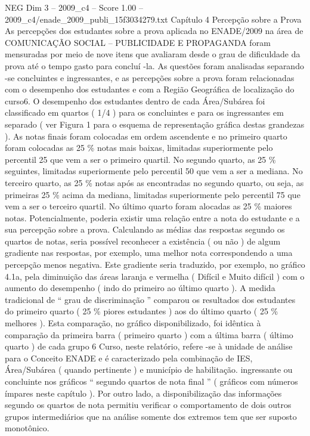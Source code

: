 \begin{textsample}{NEG Dim 3 – 2009\_c4 – Score 1.00 – 2009\_c4/enade\_2009\_publi\_15f3034279.txt}  \label{ex:f3_neg_162}
Capítulo 4 Percepção sobre a Prova As percepções dos estudantes sobre a prova aplicada no ENADE/2009 na área de COMUNICAÇÃO SOCIAL – PUBLICIDADE E PROPAGANDA foram mensuradas por meio de nove itens que avaliaram desde o grau de dificuldade da prova até o tempo gasto para concluí -la.
As questões foram analisadas separando -se concluintes e ingressantes, e as percepções sobre a prova foram relacionadas com o desempenho dos estudantes e com a Região Geográfica de localização do curso6.
O desempenho dos estudantes dentro de cada Área/Subárea foi classificado em quartos ( 1/4 ) para os concluintes e para os ingressantes em separado ( ver Figura 1 para o esquema de representação gráfica destas grandezas ).
As notas finais foram colocadas em ordem ascendente e no primeiro quarto foram colocadas as 25 \% notas mais baixas, limitadas superiormente pelo percentil 25 que vem a ser o primeiro quartil.
No segundo quarto, as 25 \% seguintes, limitadas superiormente pelo percentil 50 que vem a ser a mediana.
No terceiro quarto, as 25 \% notas após as encontradas no segundo quarto, ou seja, as primeiras 25 \% acima da mediana, limitadas superiormente pelo percentil 75 que vem a ser o terceiro quartil.
No último quarto foram alocadas as 25 \% maiores notas.
Potencialmente, poderia existir uma relação entre a nota do estudante e a sua percepção sobre a prova.
Calculando as médias das respostas segundo os quartos de notas, seria possível reconhecer a existência ( ou não ) de algum gradiente nas respostas, por exemplo, uma melhor nota correspondendo a uma percepção menos negativa.
Este gradiente seria traduzido, por exemplo, no gráfico 4.1a, pela diminuição das áreas laranja e vermelha ( Difícil e Muito difícil ) com o aumento do desempenho ( indo do primeiro ao último quarto ).
A medida tradicional de “ grau de discriminação ” comparou os resultados dos estudantes do primeiro quarto ( 25 \% piores estudantes ) aos do último quarto ( 25 \% melhores ).
Esta comparação, no gráfico disponibilizado, foi idêntica à comparação da primeira barra ( primeiro quarto ) com a última barra ( último quarto ) de cada grupo 6 Curso, neste relatório, refere -se à unidade de análise para o Conceito ENADE e é caracterizado pela combinação de IES, Área/Subárea ( quando pertinente ) e município de habilitação. ingressante ou concluinte nos gráficos “ segundo quartos de nota final ” ( gráficos com números ímpares neste capítulo ).
Por outro lado, a disponibilização das informações segundo os quartos de nota permitiu verificar o comportamento de dois outros grupos intermediários que na análise somente dos extremos tem que ser suposto monotônico.

\end{textsample}
